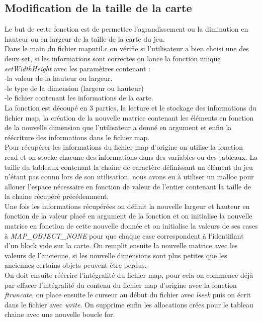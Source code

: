 \documentclass[10pt,a4paper]{article}
\begin{document}
\subsection{Modification de la taille de la carte}
\quad Le but de cette fonction est de permettre l'agrandissement ou la diminution en hauteur ou en largeur de la taille de la carte du jeu.\\
\quad Dans le main du fichier maputil.c on vérifie si l'utilisateur a bien choisi une des deux set, si les informations sont correctes on lance la fonction unique \textit{setWidthHeight} avec les paramètres contenant : \\-la valeur de la hauteur ou largeur.\\-le type de la dimension (largeur ou hauteur)\\-le fichier contenant les informations de la carte.\\
\quad La fonction est découpé en 3 parties, la lecture et le stockage des informations du fichier map, la création de la nouvelle matrice contenant les éléments en fonction de la nouvelle dimension que l'utilisateur a donné en argument et enfin la réécriture des informations dans le fichier map.\\
\quad Pour récupérer les informations du fichier map d'origine on utilise la fonction read et on stocke chacune des informations dans des variables ou des tableaux. La taille du tableaux contenant la chaine de caractère définissant un élément du jeu n'étant pas connu lors de son utilisation, nous avons eu à utiliser un malloc pour allouer l'espace nécessaire en fonction de valeur de l'entier contenant la taille de la chaine récupéré précédemment.\\
\quad Une fois les informations récupérées on définit la nouvelle largeur et hauteur en fonction de la valeur placé en argument de la fonction et on initialise la nouvelle matrice en fonction de cette nouvelle donnée et on initialise la valeurs de ses cases à \textit{MAP\_OBJECT\_NONE} pour que chaque case correspondent à l'identifiant d'un block vide sur la carte. On remplit ensuite la nouvelle matrice avec les valeurs de l'ancienne, si les nouvelle dimensions sont plus petites que les anciennes certains objets peuvent être perdus.\\
\quad On doit ensuite réécrire l'intégralité du fichier map, pour cela on commence déjà par effacer l'intégralité du contenu du fichier map d'origine avec la fonction \textit{ftruncate}, on place ensuite le curseur au début du fichier avec \textit{lseek} puis on écrit dans le fichier avec \textit{write}. On supprime enfin les allocations crées pour le tableau chaine avec une nouvelle boucle for.        
    
\end{document}
